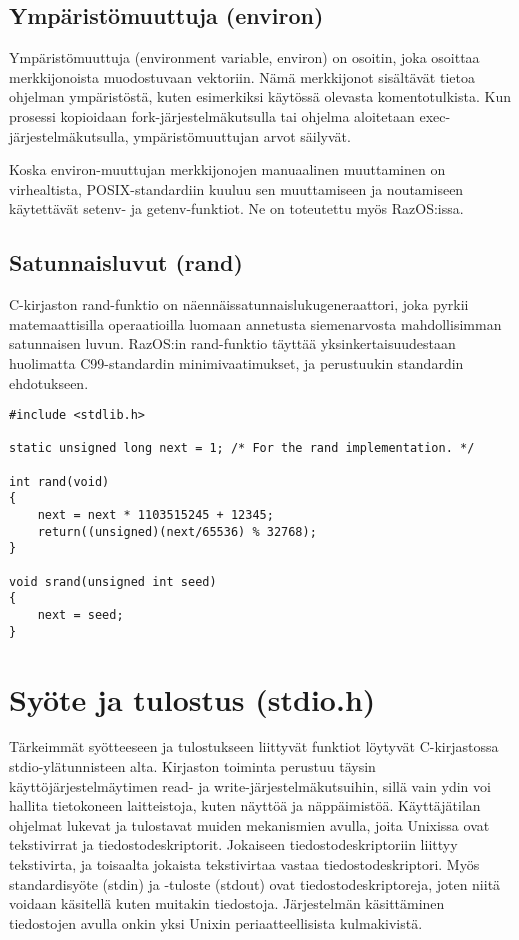 \subsection{Ympäristömuuttuja (environ)}

Ympäristömuuttuja (environment variable, environ) on osoitin, joka osoittaa merkkijonoista muodostuvaan vektoriin. Nämä merkkijonot sisältävät tietoa ohjelman ympäristöstä, kuten esimerkiksi käytössä olevasta komentotulkista. Kun prosessi kopioidaan fork-järjestelmäkutsulla tai ohjelma aloitetaan exec-järjestelmäkutsulla, ympäristömuuttujan arvot säilyvät.

\par

Koska environ-muuttujan merkkijonojen manuaalinen muuttaminen on virhealtista, POSIX-standardiin kuuluu sen muuttamiseen ja noutamiseen käytettävät setenv- ja getenv-funktiot. Ne on toteutettu myös RazOS:issa.

\subsection{Satunnaisluvut (rand)}

C-kirjaston rand-funktio on näennäissatunnaislukugeneraattori, joka pyrkii matemaattisilla operaatioilla luomaan annetusta siemenarvosta mahdollisimman satunnaisen luvun. RazOS:in rand-funktio täyttää yksinkertaisuudestaan huolimatta C99-standardin minimivaatimukset, ja perustuukin standardin ehdotukseen.

\begin{footnotesize}
\begin{verbatim}
#include <stdlib.h>

static unsigned long next = 1; /* For the rand implementation. */

int rand(void)
{
	next = next * 1103515245 + 12345;
	return((unsigned)(next/65536) % 32768);
}

void srand(unsigned int seed)
{
	next = seed;
}
\end{verbatim}
\end{footnotesize}

\section{Syöte ja tulostus (stdio.h)}

Tärkeimmät syötteeseen ja tulostukseen liittyvät funktiot löytyvät C-kirjastossa stdio-ylätunnisteen alta. Kirjaston toiminta perustuu täysin käyttöjärjestelmäytimen read- ja write-järjestelmäkutsuihin, sillä vain ydin voi hallita tietokoneen laitteistoja, kuten näyttöä ja näppäimistöä. Käyttäjätilan ohjelmat lukevat ja tulostavat muiden mekanismien avulla, joita Unixissa ovat tekstivirrat ja tiedostodeskriptorit. Jokaiseen tiedostodeskriptoriin liittyy tekstivirta, ja toisaalta jokaista tekstivirtaa vastaa tiedostodeskriptori. Myös standardisyöte (stdin) ja -tuloste (stdout) ovat tiedostodeskriptoreja, joten niitä voidaan käsitellä kuten muitakin tiedostoja. Järjestelmän käsittäminen tiedostojen avulla onkin yksi Unixin periaatteellisista kulmakivistä.

